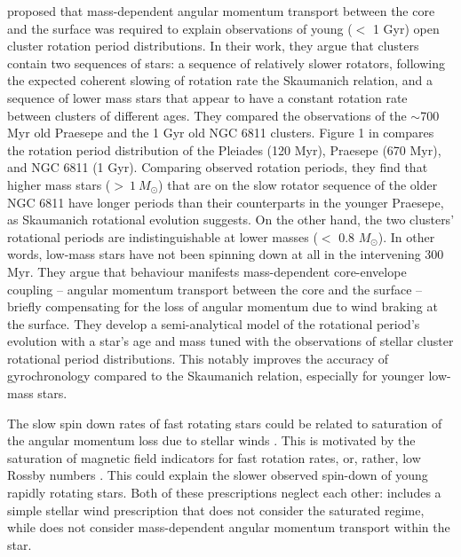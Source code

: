 \citet{spada_competing_2020} proposed that mass-dependent angular momentum transport between the core and the surface was required to explain observations of young ($<$ 1 Gyr) open cluster rotation period distributions.
In their work, they argue that clusters contain two sequences of stars: a sequence of relatively slower rotators, following the expected coherent slowing of rotation rate  the Skaumanich relation, and a sequence of lower mass stars that appear to have a constant rotation rate between clusters of different ages.
They compared the observations of the $\sim$700 Myr old Praesepe and the 1 Gyr old NGC 6811 clusters.
Figure 1 in \citet{spada_competing_2020} compares the rotation period distribution of the Pleiades (120 Myr), Praesepe (670 Myr), and NGC 6811 (1 Gyr).
Comparing observed rotation periods, they find that higher mass stars (${>\ 1 \ M_{\odot}}$) that are on the slow rotator sequence of the older NGC 6811 have longer periods than their counterparts in the younger Praesepe, as Skaumanich rotational evolution suggests.
On the other hand, the two clusters' rotational periods are indistinguishable at lower masses ($<$ 0.8 $M_{\odot}$).
In other words, low-mass stars have not been spinning down at all in the intervening 300 Myr. 
They argue that behaviour manifests mass-dependent core-envelope coupling -- angular momentum transport between the core and the surface -- briefly compensating for the loss of angular momentum due to wind braking at the surface.
They develop a semi-analytical model of the rotational period's evolution with a star's age and mass tuned with the observations of stellar cluster rotational period distributions.
This notably improves the accuracy of gyrochronology compared to the Skaumanich relation, especially for younger low-mass stars.

The slow spin down rates of fast rotating stars could  be related to saturation of the angular momentum loss due to stellar winds \citep{johnstone_stellar_2015, johnstone_stellar_2015-1,gallet_improved_2013}.
This is motivated by the saturation of magnetic field indicators for fast rotation rates, or, rather, low Rossby numbers \citep{wright_stellar-activity-rotation_2011}.
This could explain the slower observed spin-down of young rapidly rotating stars.
Both of these prescriptions neglect each other: \citet{spada_competing_2020} includes a simple stellar wind prescription that does not consider the saturated regime, while \citet{gallet_improved_2013} does not consider mass-dependent angular momentum transport within the star.

